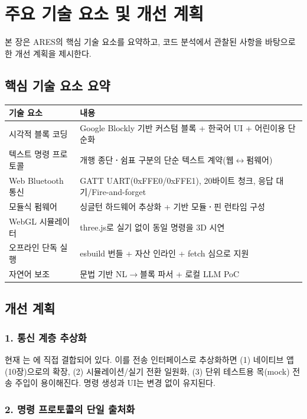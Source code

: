 \section{주요 기술 요소 및 개선 계획}

본 장은 ARES의 핵심 기술 요소를 요약하고, 코드 분석에서 관찰된 사항을
바탕으로 한 개선 계획을 제시한다.

\subsection{핵심 기술 요소 요약}

\begin{longtable}{L{3.6cm} L{10.8cm}}
\toprule
{}\textbf{기술 요소} & \textbf{내용} \\
\midrule
\endhead
시각적 블록 코딩 & Google Blockly 기반 커스텀 블록 + 한국어 UI + 어린이용 단순화 \\
텍스트 명령 프로토콜 & 개행 종단\textbf{·}쉼표 구분의 단순 텍스트 계약(웹$\leftrightarrow$펌웨어) \\
Web Bluetooth 통신 & GATT UART(0xFFE0/0xFFE1), 20바이트 청크, 응답 대기/Fire-and-forget \\
모듈식 펌웨어 & 싱글턴 하드웨어 추상화 +  기반 모듈\textbf{·}핀 런타임 구성 \\
WebGL 시뮬레이터 & three.js로 실기 없이 동일 명령을 3D 시연 \\
오프라인 단독 실행 & esbuild 번들 + 자산 인라인 + fetch 심으로  지원 \\
자연어 보조 & 문법 기반 NL$\to$블록 파서 + 로컬 LLM PoC \\
\bottomrule
\end{longtable}

\subsection{개선 계획}

\subsubsection{1. 통신 계층 추상화}

현재 는 에 직접 결합되어 있다.
이를 전송 인터페이스로 추상화하면 (1) 네이티브 앱(10장)으로의 확장,
(2) 시뮬레이션/실기 전환 일원화, (3) 단위 테스트용 목(mock) 전송 주입이
용이해진다. 명령 생성과 UI는 변경 없이 유지된다.

\subsubsection{2. 명령 프로토콜의 단일 출처화}

